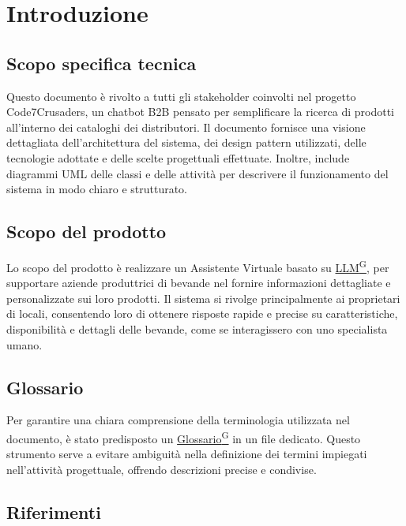\section{Introduzione}

\subsection{Scopo specifica tecnica}
Questo documento è rivolto a tutti gli stakeholder coinvolti nel progetto Code7Crusaders, un chatbot B2B pensato per semplificare la ricerca di prodotti all'interno dei cataloghi dei distributori.
Il documento fornisce una visione dettagliata dell’architettura del sistema, dei design pattern utilizzati, delle tecnologie adottate e delle scelte progettuali effettuate. Inoltre, include diagrammi UML delle classi e delle attività per descrivere il funzionamento del sistema in modo chiaro e strutturato.
  
\subsection{Scopo del prodotto}
Lo scopo del prodotto è realizzare un Assistente Virtuale basato su \href{https://code7crusaders.github.io/docs/PB/documentazione_interna/glossario.html#llm-large-language-model}{LLM\textsuperscript{G}}, 
per supportare aziende produttrici di bevande nel fornire 
informazioni dettagliate e personalizzate sui loro prodotti. 
Il sistema si rivolge principalmente ai proprietari di locali, 
consentendo loro di ottenere risposte rapide e precise su caratteristiche, 
disponibilità e dettagli delle bevande, come se interagissero con uno specialista umano.

\subsection{Glossario}
Per garantire una chiara comprensione della terminologia utilizzata nel documento,
è stato predisposto un \href{https://code7crusaders.github.io/docs/PB/documentazione_interna/glossario.html#glossario}{Glossario\textsuperscript{G}} in un file dedicato. Questo strumento 
serve a evitare ambiguità nella definizione dei termini impiegati nell’attività progettuale, 
offrendo descrizioni precise e condivise. 


\subsection{Riferimenti}
